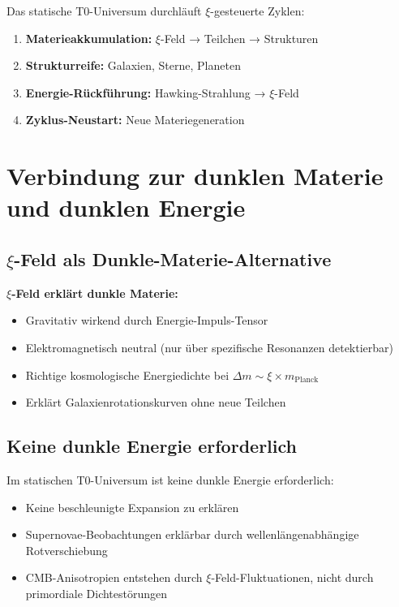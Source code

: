 \documentclass[12pt,a4paper]{article}
\newcommand{\xipar}{\xi}
\begin{document}
	Das statische T0-Universum durchläuft $\xi$-gesteuerte Zyklen:
	
	\begin{enumerate}
		\item \textbf{Materieakkumulation:} $\xi$-Feld → Teilchen → Strukturen
		\item \textbf{Strukturreife:} Galaxien, Sterne, Planeten
		\item \textbf{Energie-Rückführung:} Hawking-Strahlung → $\xi$-Feld
		\item \textbf{Zyklus-Neustart:} Neue Materiegeneration
	\end{enumerate}
	
	\section{Verbindung zur dunklen Materie und dunklen Energie}
	
	\subsection{$\xi$-Feld als Dunkle-Materie-Alternative}
	
	\begin{keyresult}
		\textbf{$\xi$-Feld erklärt dunkle Materie:}
		
		\begin{itemize}
			\item Gravitativ wirkend durch Energie-Impuls-Tensor
			\item Elektromagnetisch neutral (nur über spezifische Resonanzen detektierbar)
			\item Richtige kosmologische Energiedichte bei $\Delta m \sim \xipar \times m_{\text{Planck}}$
			\item Erklärt Galaxienrotationskurven ohne neue Teilchen
		\end{itemize}
	\end{keyresult}
	
	\subsection{Keine dunkle Energie erforderlich}
	
	Im statischen T0-Universum ist keine dunkle Energie erforderlich:
	
	\begin{itemize}
		\item Keine beschleunigte Expansion zu erklären
		\item Supernovae-Beobachtungen erklärbar durch wellenlängenabhängige Rotverschiebung
		\item CMB-Anisotropien entstehen durch $\xi$-Feld-Fluktuationen, nicht durch primordiale Dichtestörungen
	\end{itemize}
	
\end{document}
